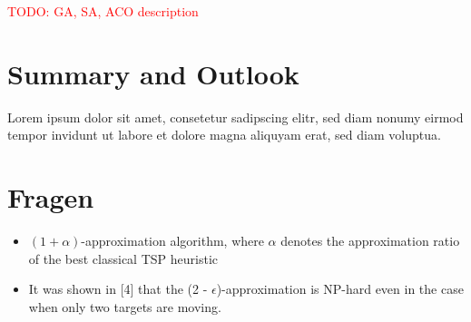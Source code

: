 \documentclass{acm_proc_article-sp}
\begin{document}
\textcolor{red}{TODO: GA, SA, ACO description}

\section{Summary and Outlook}
Lorem ipsum dolor sit amet, consetetur sadipscing elitr, sed diam nonumy eirmod tempor invidunt ut labore et dolore magna aliquyam erat, sed diam voluptua.

\section{Fragen}
\begin{itemize}
\item
$(1+\alpha)$-approximation algorithm, where $\alpha$ denotes the approximation ratio of the best classical TSP heuristic

\item
It was shown in [4] that the (2 - $\epsilon$)-approximation is NP-hard even in the case when only two targets are
moving.

\end{itemize}

{}

\end{document}

